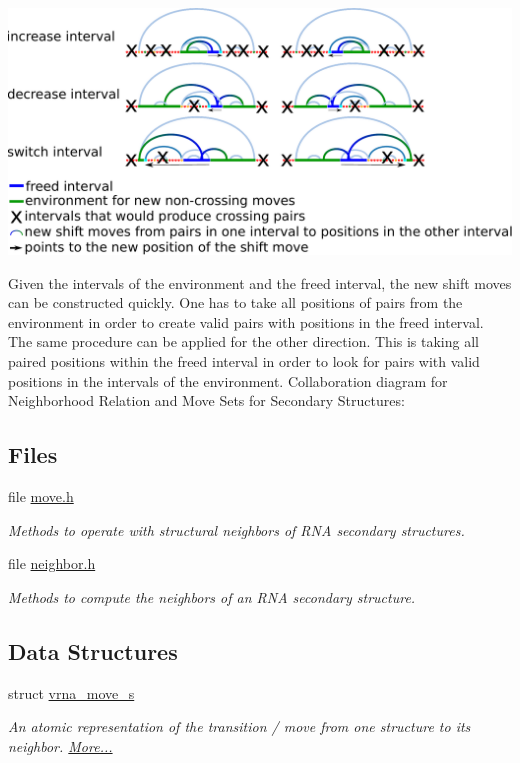  
\begin{DoxyImageNoCaption}
  \mbox{\includegraphics[width=\textwidth,height=\textheight/2,keepaspectratio=true]{shift_move_intervals}}
\end{DoxyImageNoCaption}


Given the intervals of the environment and the freed interval, the new shift moves can be constructed quickly. One has to take all positions of pairs from the environment in order to create valid pairs with positions in the freed interval. The same procedure can be applied for the other direction. This is taking all paired positions within the freed interval in order to look for pairs with valid positions in the intervals of the environment. Collaboration diagram for Neighborhood Relation and Move Sets for Secondary Structures\+:
\subsection*{Files}
\begin{DoxyCompactItemize}
\item 
file \mbox{\hyperlink{move_8h}{move.\+h}}
\begin{DoxyCompactList}\small\item\em Methods to operate with structural neighbors of R\+NA secondary structures. \end{DoxyCompactList}\item 
file \mbox{\hyperlink{landscape_2neighbor_8h}{neighbor.\+h}}
\begin{DoxyCompactList}\small\item\em Methods to compute the neighbors of an R\+NA secondary structure. \end{DoxyCompactList}\end{DoxyCompactItemize}
\subsection*{Data Structures}
\begin{DoxyCompactItemize}
\item 
struct \mbox{\hyperlink{group__neighbors_structvrna__move__s}{vrna\+\_\+move\+\_\+s}}
\begin{DoxyCompactList}\small\item\em An atomic representation of the transition / move from one structure to its neighbor.  \mbox{\hyperlink{group__neighbors_structvrna__move__s}{More...}}\end{DoxyCompactList}\end{DoxyCompactItemize}

